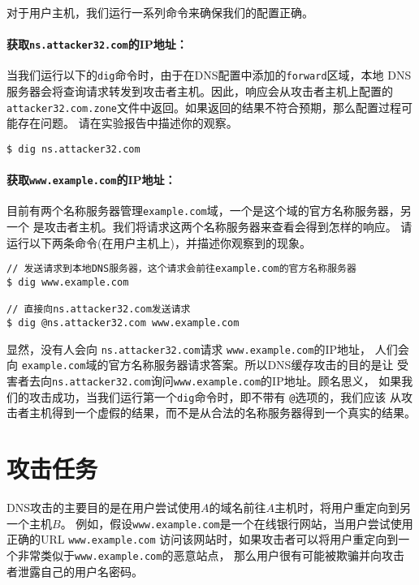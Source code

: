 对于用户主机，我们运行一系列命令来确保我们的配置正确。


\paragraph{获取\texttt{ns.attacker32.com}的IP地址：}
当我们运行以下的\texttt{dig}命令时，由于在DNS配置中添加的\texttt{forward}区域，本地
DNS服务器会将查询请求转发到攻击者主机。因此，响应会从攻击者主机上配置的
\texttt{attacker32.com.zone}文件中返回。如果返回的结果不符合预期，那么配置过程可能存在问题。
请在实验报告中描述你的观察。


\begin{lstlisting}
$ dig ns.attacker32.com
\end{lstlisting}



\paragraph{获取\texttt{www.example.com}的IP地址：} 
目前有两个名称服务器管理\texttt{example.com}域，一个是这个域的官方名称服务器，另一个
是攻击者主机。我们将请求这两个名称服务器来查看会得到怎样的响应。
请运行以下两条命令(在用户主机上)，并描述你观察到的现象。 


\begin{lstlisting}
// 发送请求到本地DNS服务器，这个请求会前往example.com的官方名称服务器
$ dig www.example.com

// 直接向ns.attacker32.com发送请求 
$ dig @ns.attacker32.com www.example.com
\end{lstlisting}
 


显然，没有人会向 \texttt{ns.attacker32.com}请求 \texttt{www.example.com}的IP地址，
人们会向 \texttt{example.com}域的官方名称服务器请求答案。所以DNS缓存攻击的目的是让
受害者去向\texttt{ns.attacker32.com}询问\texttt{www.example.com}的IP地址。顾名思义，
如果我们的攻击成功，当我们运行第一个\texttt{dig}命令时，即不带有 \texttt{@}选项的，我们应该
从攻击者主机得到一个虚假的结果，而不是从合法的名称服务器得到一个真实的结果。



\section{攻击任务}


DNS攻击的主要目的是在用户尝试使用$A$的域名前往$A$主机时，将用户重定向到另一个主机$B$。
例如，假设{\tt www.example.com}是一个在线银行网站，当用户尝试使用正确的URL {\tt www.example.com}
访问该网站时，如果攻击者可以将用户重定向到一个非常类似于{\tt www.example.com}的恶意站点，
那么用户很有可能被欺骗并向攻击者泄露自己的用户名密码。



